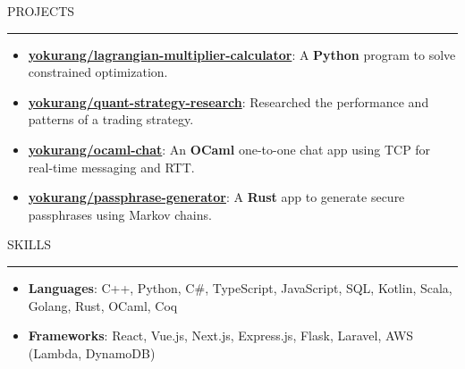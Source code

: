 \documentclass[letterpaper, 11pt]{article}
\def\sectionlineskip{\medskip}
\def\sectionskip{\medskip}
\def \entryspacing {-0pt}
\newcommand{\SectionHeading}[1]{
  \sectionskip
  \raggedright\raggedbottom\MakeUppercase{\large{#1}}
  \sectionlineskip
  \hrule
  \color{black}
}
\newcommand{\ResumeItem}[2]{
  \item{
    \textbf{#1}{: #2 \vspace{-2.835pt}}
  }
}
\newcommand{\ResumeProjectItem}[3]{
  \item{
    \href{#2}{\textbf{#1}}{: #3 \vspace{-2.835pt}}
  }
}
\newcommand{\ResumeEntryStart}{\begin{itemize}[leftmargin=0mm, label={}]}
\newcommand{\ResumeEntryEnd}{\end{itemize}\vspace{-2.835pt}} %
\newcommand{\ProjectItemListStart}{\begin{itemize}[leftmargin=*, label=$\bullet$]}
\newcommand{\ProjectItemListEnd}{\end{itemize}\vspace{\entryspacing}}
\begin{document}
  \SectionHeading{Projects}
  \ProjectItemListStart
    \ResumeProjectItem{yokurang/lagrangian-multiplier-calculator}
    {https://github.com/yokurang/lm-calculator}
    {A \textbf{Python} program to solve constrained optimization.}
    \ResumeProjectItem{yokurang/quant-strategy-research}
    {https://github.com/yokurang/quant-strategy-research}
    {Researched the performance and patterns of a trading strategy.}
    \ResumeProjectItem{yokurang/ocaml-chat}
    {https://github.com/yokurang/ocaml-chat}
    {An \textbf{OCaml} one-to-one chat app using TCP for real-time messaging and RTT.}
    \ResumeProjectItem{yokurang/passphrase-generator}
    {https://github.com/yokurang/passphrase-generator}
    {A \textbf{Rust} app to generate secure passphrases using Markov chains.}
  \ProjectItemListEnd

  \SectionHeading{Skills}
  \ResumeEntryStart
    \ResumeItem{Languages}{ C++, Python, C\#, TypeScript, JavaScript, SQL, Kotlin, Scala, Golang, Rust, OCaml, Coq }
    \ResumeItem{Frameworks}{ React, Vue.js, Next.js, Express.js, Flask, Laravel, AWS (Lambda, DynamoDB) }
  \ResumeEntryEnd
\end{document}
